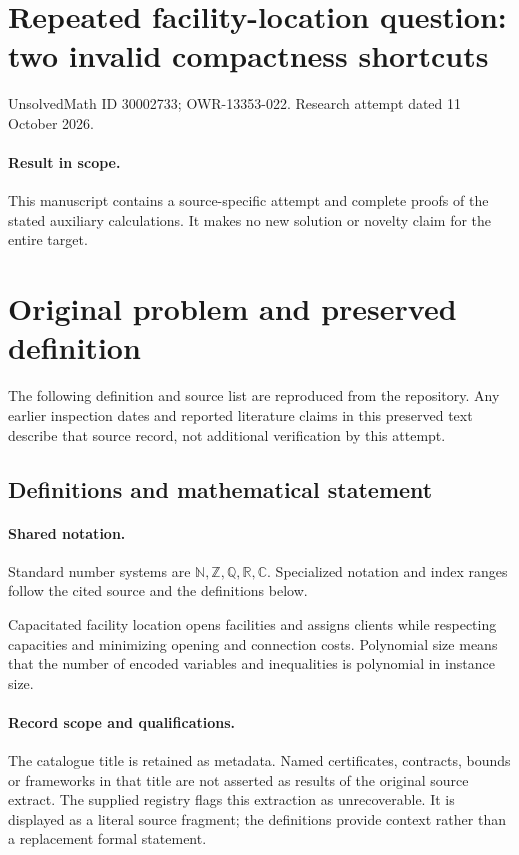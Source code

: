 \documentclass[11pt]{article}
\begin{document}
\section*{Repeated facility-location question: two invalid compactness shortcuts}
\noindent UnsolvedMath ID 30002733; OWR-13353-022. Research attempt dated 11 October 2026.
\paragraph{Result in scope.}This manuscript contains a source-specific attempt and complete proofs of the stated auxiliary calculations. It makes no new solution or novelty claim for the entire target.
\section{Original problem and preserved definition}
The following definition and source list are reproduced from the repository. Any earlier inspection dates and reported literature claims in this preserved text describe that source record, not additional verification by this attempt.
\subsection{Definitions and mathematical statement}

\paragraph{Shared notation.}Standard number systems are $\mathbb N,\mathbb Z,\mathbb Q,\mathbb R,\mathbb C$. Specialized notation and index ranges follow the cited source and the definitions below.


Capacitated facility location opens facilities and assigns clients while respecting capacities and minimizing opening and connection costs. Polynomial size means that the number of encoded variables and inequalities is polynomial in instance size.
\paragraph{Record scope and qualifications.}
The catalogue title is retained as metadata. Named certificates, contracts, bounds or frameworks in that title are not asserted as results of the original source extract.
The supplied registry flags this extraction as unrecoverable. It is displayed as a literal source fragment; the definitions provide context rather than a replacement formal statement.
\end{document}
